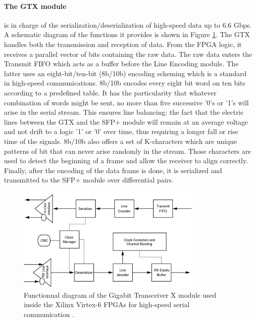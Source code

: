       \paragraph{The GTX module} is in charge of the serialization/deserialization of high-speed data up to 6.6 Gbps. A schematic diagram of the functions it provides is shown in Figure \ref{fig:II-3-gtx}. The GTX handles both the transmission and reception of data. From the FPGA logic, it receives a parallel vector of bits containing the raw data. The raw data enters the Transmit FIFO which acts as a buffer before the Line Encoding module. The latter uses an eight-bit/ten-bit (8b/10b) encoding scheming which is a standard in high-speed communications. 8b/10b encodes every eight bit word on ten bits according to a predefined table. It has the particularity that whatever combination of words might be sent, no more than five successive '0's or '1's will arise in the serial stream. This ensures line balancing: the fact that the electric lines between the GTX and the SFP+ module will remain at an average voltage and not drift to a logic '1' or '0' over time, thus requiring a longer fall or rise time of the signals. 8b/10b also offers a set of K-characters which are unique patterns of bit that can never arise randomly in the stream. Those characters are used to detect the beginning of a frame and allow the receiver to align correctly. Finally, after the encoding of the data frame is done, it is serialized and transmitted to the SFP+ module over differential pairs. \\

      \begin{figure}[h!]
        \centering
        \includegraphics[width=0.8\textwidth]{img/II-3-test-beam/gtx.png}
        \caption{Functionnal diagram of the Gigabit Transceiver X module used inside the Xilinx Virtex-6 FPGAs for high-speed serial communication \cite{GTX}.}
        \label{fig:II-3-gtx}
      \end{figure}

